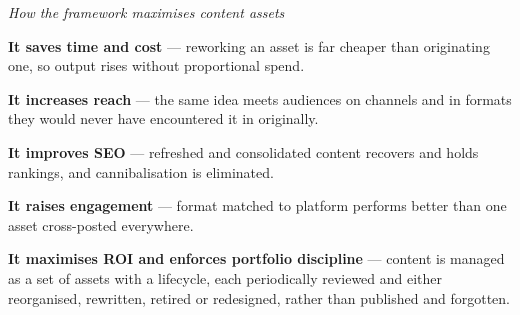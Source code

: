 \begin{qlist}
\textit{How the framework maximises content assets}
\begin{apts}\setcounter{enumi}{4}
\item \textbf{It saves time and cost} --- reworking an asset is far cheaper
      than originating one, so output rises without proportional spend.
\item \textbf{It increases reach} --- the same idea meets audiences on channels
      and in formats they would never have encountered it in originally.
\item \textbf{It improves SEO} --- refreshed and consolidated content recovers
      and holds rankings, and cannibalisation is eliminated.
\item \textbf{It raises engagement} --- format matched to platform performs
      better than one asset cross-posted everywhere.
\item \textbf{It maximises ROI and enforces portfolio discipline} --- content is
      managed as a set of assets with a lifecycle, each periodically reviewed
      and either reorganised, rewritten, retired or redesigned, rather than
      published and forgotten.
\end{apts}


\end{qlist}
